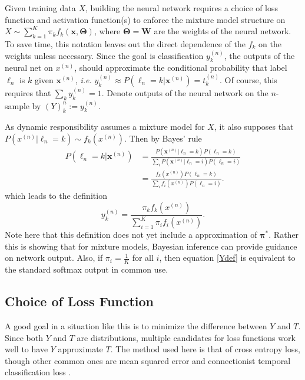 Given training data $X$, building the neural network requires a choice of loss function and activation function(s) to enforce the mixture model structure on 
$X \sim \sum_{k=1}^{K}\pi_kf_k(\bm x,\bm\Theta)$, where $\bm\Theta = \bm W$ are the
weights of the neural network. To save time, this notation leaves out the direct dependence of 
the $f_k$ on the weights unless necessary. Since the goal is classification $y_k^{(n)}$, the outputs of the neural net on \( x^{(n)} \), should approximate the conditional probability that label $\ell_n$ is 
$k$ given $\bm x^{(n)}$, \textit{i.e.} $y_k^{(n)}\approx P(\ell_n=k|\bm x^{(n)}) = t_k^{(n)}$. 
Of course, this requires that $\sum_{k}y_k^{(n)} = 1$.  Denote outputs of the neural network  on the \( n \)-sample by \( (Y)_k^{n} :=  y_k^{(n)}\).

As dynamic responsibility assumes a mixture model for $X$, it also supposes that $P(x^{(n)}|\ell_n=k)\sim f_k(x^{(n)})$. Then by Bayes' rule 
\begin{align}
P(\ell_n=k|\bm x^{(n)}) &= \frac{P(\bm x^{(n)}|\ell_n=k)P(\ell_n=k)}{\sum_i P(\bm x^{(n)}|\ell_n=i) P(\ell_n=i)}\\ \nonumber
					    &= \frac{f_k(x^{(n)})P(\ell_n=k)}{\sum_i f_i(x^{(n)})P(\ell_n=i)}.
\end{align}                         
which leads to the definition 
\begin{equation}\label{Ydef}
y_k^{(n)}=\dfrac{\pi_k f_k(x^{(n)})}{\sum_{i=1}^{K}\pi_i f_i(x^{(n)})}.
\end{equation}
Note here that this definition does not yet include a \DR approximation of \( \bm\pi^{\ast} \). Rather this is showing that for mixture models, Bayesian inference can provide guidance on network output.  Also, if \( \pi_i = \frac 1K\) for all $i$, then equation \eqref{Ydef} is equivalent to the standard softmax output in common use.

\subsection{Choice of Loss Function}
A good goal  in a situation like this is to minimize the difference between $Y$ 
and $T$. Since both $Y$ and $T$ are distributions, multiple candidates for loss functions work well to have $Y$ approximate $T$. The method used here is that of cross entropy loss, though other common ones are mean squared error \cite{Bishop1995} and connectionist temporal classification loss \cite{Graves06ctc}.  

